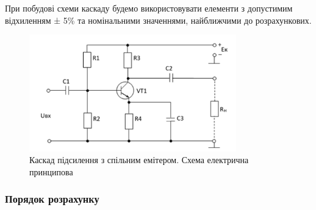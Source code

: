 \documentclass[main.tex]{subfiles}
\begin{document}
При побудові схеми каскаду будемо використовувати елементи з допустимим відхиленням ± 5\% та номінальними значеннями, найближчими до розрахункових.
\begin{figure}[ht]
\centering
\includegraphics[width=0.8\textwidth]{images/cascad_ce.png}
\caption{Каскад підсилення з спільним емітером. Схема електрична принципова}
\label{fig:cascad_ce}
\end{figure}

\subsubsection{Порядок розрахунку}
\end{document}
